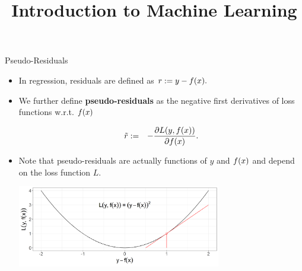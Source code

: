 




\newcommand{\titlefigure}{figure_man/pseudo_residual_1.png}
\newcommand{\learninggoals}{
\item Know the concept of pseudo-residuals 
\item Understand the relationship between pseudo-residuals and gradient descent 
}

\title{Introduction to Machine Learning}
\date{}





\begin{vbframe}{Pseudo-Residuals}

\begin{itemize}
	\item In regression, residuals are defined as $
			r := y - f(x).$
\item We further define \textbf{pseudo-residuals} as the negative first derivatives of loss functions w.r.t. $f(x)$

\vspace*{-0.3cm}
  \begin{eqnarray*}
    \tilde r &:=& - \frac{\partial \Lxy}{\partial \fx}.  %
  \end{eqnarray*}
\item Note that pseudo-residuals are actually functions of $y$ and $f(x)$ and depend on the loss function $L$. %

\vfill

\includegraphics[width=0.7\textwidth]{figure/plot_quad_pseudores.png}

\end{itemize}

\end{vbframe}


